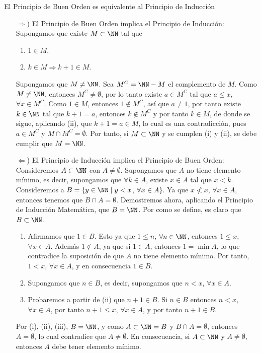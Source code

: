 \begin{theorem}{}{}
    El Principio de Buen Orden es equivalente al Principio de Inducción

    \tcblower
    \demostracion
    \begin{enumerate}[topsep=4pt, itemsep=0pt]
        \item[$\Rightarrow$)] El Principio de Buen Orden implica el Principio de Inducción: Supongamos que existe $M \subset \NN$ tal que
        \begin{enumerate}[label=\roman*)]
            \item $1 \in M$,
            \item $k \in M \Longrightarrow k + 1 \in M$.
        \end{enumerate}
        Supongamos que $M \neq \NN$. Sea $M^C = \NN - M$ el complemento de $M$. Como $M \neq \NN$, entonces $M^C \neq \emptyset$, por lo tanto existe $a \in M^C$ tal que $a \leq x$, $\forall x \in M^C$. Como $1 \in M$, entonces $1 \notin M^C$, así que $a \neq 1$, por tanto existe $k \in \NN$ tal que $k + 1 = a$, entonces $k \notin M^C$ y por tanto $k \in M$, de donde se sigue, aplicando (ii), que $k + 1 = a \in M$, lo cual es una contradicción, pues $a \in M^C$ y $M \cap M^C = \emptyset$. Por tanto, si $M \subset \NN$ y se cumplen (i) y (ii), se debe cumplir que $M = \NN$.
        \item[$\Leftarrow$)] El Principio de Inducción implica el Principio de Buen Orden: Consideremos $A \subset \NN$ con $A \neq \emptyset$. Supongamos que $A$ no tiene elemento mínimo, es decir, supongamos que $\forall k \in A$, existe $x \in A$ tal que $x < k$. Consideremos a $B = \{ y \in \NN \mid y < x$, $\forall x \in A \}$. Ya que $x \nless x$, $\forall x \in A$, entonces tenemos que $B \cap A = \emptyset$. Demostremos ahora, aplicando el Principio de Inducción Matemática, que $B = \NN$. Por como se define, es claro que $B \subset \NN$.
        \begin{enumerate}[label=\roman*)]
            \item Afirmamos que $1 \in B$. Esto ya que $1 \leq n$, $\forall n \in \NN$, entonces $1 \leq x$, $\forall x \in A$. Además $1 \notin A$, ya que si $1 \in A$, entonces $1 = \min A$, lo que contradice la suposición de que $A$ no tiene elemento mínimo. Por tanto, $1 < x$, $\forall x \in A$, y en consecuencia $1 \in B$.
            \item Supongamos que $n \in B$, es decir, supongamos que $n < x$, $\forall x \in A$.
            \item Probaremos a partir de (ii) que $n + 1 \in B$. Si $n \in B$ entonces $n < x$, $\forall x \in A$, por tanto $n + 1 \leq x$, $\forall x \in A$, y por tanto $n + 1 \in B$.
        \end{enumerate}
        Por (i), (ii), (iii), $B = \NN$, y como $A \subset \NN = B$ y $B \cap A = \emptyset$, entonces $A = \emptyset$, lo cual contradice que $A \neq \emptyset$. En consecuencia, si $A \subset \NN$ y $A \neq \emptyset$, entonces $A$ debe tener elemento mínimo.
    \end{enumerate}
\end{theorem}

